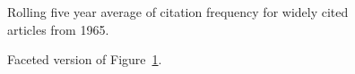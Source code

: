 \documentclass[
  10pt,
  letterpaper,
  DIV=11,
  numbers=noendperiod,
  twoside]{scrartcl}
\begin{document}
\begin{figure}


\caption{\label{fig-citation-spaghetti-1965}Rolling five year average of
citation frequency for widely cited articles from 1965.}

\end{figure}%

\begin{figure}


\caption{\label{fig-citation-facet-1965}Faceted version of
Figure~\ref{fig-citation-spaghetti-1965}.}

\end{figure}%
\end{document}
